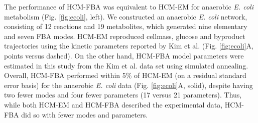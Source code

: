 \documentclass[10pt,twocolumn,twoside,final]{IEEEtran}
\begin{document}

The performance of HCM-FBA was equivalent to HCM-EM for anaerobic \textit{E. coli} metabolism (Fig. \ref{fig:ecoli}, left).
We constructed an anaerobic \textit{E. coli} network, consisting of 12 reactions and 19 metabolites, which generated nine elementary and seven FBA modes.
HCM-EM reproduced cellmass, glucose and byproduct trajectories
using the kinetic parameters reported by Kim et al. \cite{2008_kim_varner_ramkrishna_BiotechProg} (Fig. \ref{fig:ecoli}A, points versus dashed).
On the other hand, HCM-FBA model parameters were estimated in this study from the Kim et al. data set using simulated annealing.
Overall, HCM-FBA performed within 5\% of HCM-EM (on a residual standard error basis) for the anaerobic \textit{E. coli} data (Fig. \ref {fig:ecoli}A, solid),
despite having two fewer modes and four fewer parameters (17 versus 21 parameters).
Thus, while both HCM-EM and HCM-FBA described the experimental data, HCM-FBA did so with fewer modes and parameters.
\end{document}

